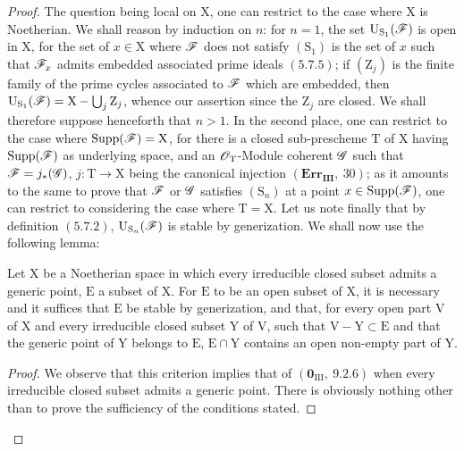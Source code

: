 \begin{proof}
The question being local on $\mathrm{X}$, one can restrict to the case where $\mathrm{X}$ is Noetherian.
We shall reason by induction on $n$: for $n=1$, the set $\mathrm{U}_{\mathrm{S}_1}(\mathscr{F})$ is open
in $\mathrm{X}$, for the set of $x\in\mathrm{X}$ where $\mathscr{F}$ does not satisfy $(\mathrm{S}_1)$ is the set of $x$ such that $\mathscr{F}_x$
admits embedded associated prime ideals $(5.7.5)$; if $(\mathrm{Z}_j)$ is the finite family of the
prime cycles associated to $\mathscr{F}$ which are embedded, then $\mathrm{U}_{\mathrm{S}_1}(\mathscr{F})=\mathrm{X}-\bigcup_j\mathrm{Z}_j$,
whence our assertion since the $\mathrm{Z}_j$ are closed. We shall therefore suppose henceforth that
$n>1$. In the second place, one can restrict to the case where $\operatorname{Supp}(\mathscr{F})=\mathrm{X}$, for there is a
closed sub-prescheme $\mathrm{T}$ of $\mathrm{X}$ having $\operatorname{Supp}(\mathscr{F})$ as underlying space, and an $\mathscr{O}_\mathrm{T}$-Module
coherent $\mathscr{G}$ such that $\mathscr{F}=j_*(\mathscr{G})$, $j:\mathrm{T}\to\mathrm{X}$ being the canonical injection $(\textbf{Err}_\textbf{III},~30)$;
as it amounts to the same to prove that $\mathscr{F}$ or $\mathscr{G}$ satisfies $(\mathrm{S}_n)$ at a point $x\in\operatorname{Supp}(\mathscr{F})$,
one can restrict to considering the case where $\mathrm{T}=\mathrm{X}$. Let us note finally that by definition $(5.7.2)$,
$\mathrm{U}_{\mathrm{S}_n}(\mathscr{F})$ is stable by generization. We shall now use the following lemma:

\begin{lemma}[6.11.6.1]
\label{IV.6.11.6.1}
Let $\mathrm{X}$ be a Noetherian space in which every irreducible closed subset
admits a generic point, $\mathrm{E}$ a subset of $\mathrm{X}$. For $\mathrm{E}$ to be an open subset of $\mathrm{X}$, it is necessary and it
suffices that $\mathrm{E}$ be stable by generization, and that, for every open part $\mathrm{V}$ of $\mathrm{X}$ and every irreducible
closed subset $\mathrm{Y}$ of $\mathrm{V}$, such that $\mathrm{V}-\mathrm{Y}\subset\mathrm{E}$ and that the generic point of $\mathrm{Y}$ belongs to $\mathrm{E}$,
$\mathrm{E}\cap\mathrm{Y}$ contains an open non-empty part of $\mathrm{Y}$.
\end{lemma}

\begin{proof}
We observe that this criterion implies that of $(\mathbf{0}_{\mathrm{III}},~9.2.6)$ when every irreducible
closed subset admits a generic point. There is obviously nothing other than to prove
the sufficiency of the conditions stated.


\end{proof}
\end{proof}
